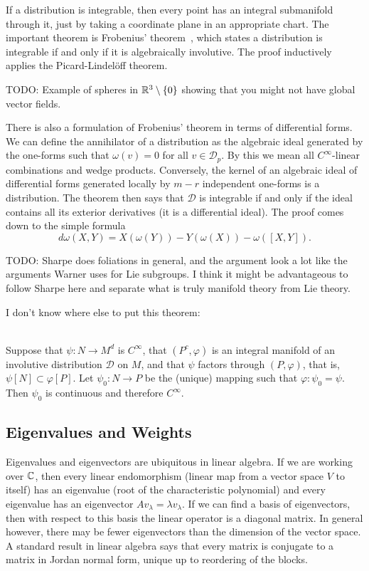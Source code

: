 If a distribution is integrable, then every point has an integral submanifold through it, just by taking a coordinate plane in an appropriate chart.
The important theorem is Frobenius' theorem~\cite[2.4.1]{Sharpe1997}, which states a distribution is integrable if and only if it is algebraically involutive.
The proof inductively applies the Picard-Lindelöff theorem.

TODO: Example of spheres in $\mathbb{R}^3\setminus\{0\}$ showing that you might not have global vector fields.

There is also a formulation of Frobenius' theorem in terms of differential forms.
We can define the annihilator of a distribution as the algebraic ideal generated by the one-forms such that $\omega(v) = 0$ for all $v \in \mathcal{D}_p$.
By this we mean all $C^\infty$-linear combinations and wedge products.
Conversely, the kernel of an algebraic ideal of differential forms generated locally by $m-r$ independent one-forms is a distribution.
The theorem then says that $\mathcal{D}$ is integrable if and only if the ideal contains all its exterior derivatives (it is a differential ideal).
The proof comes down to the simple formula
\[
d\omega(X,Y) = X(\omega(Y)) - Y(\omega(X)) - \omega([X,Y]).
\]

TODO: Sharpe does foliations in general, and the argument look a lot like the arguments Warner uses for Lie subgroups.
I think it might be advantageous to follow Sharpe here and separate what is truly manifold theory from Lie theory.


I don't know where else to put this theorem:
\begin{theorem}\label{theorem:cinfty}
\textup{\cite[1.62]{Warner1983}}\\
Suppose that $\psi \colon N \to M^d$ is $C^{\infty}$, that $(P^c,\varphi)$ is an integral manifold of an involutive distribution $\mathcal{D}$ on $M$, and that $\psi$ factors through $(P,\varphi)$, that is, $\psi[N] \subset \varphi[P]$. Let $\psi_0 \colon N \to P$ be the (unique) mapping such that $\varphi\colon \psi_0 = \psi$. Then $\psi_0$ is continuous and therefore $C^{\infty}$.
\end{theorem}

\subsection{Eigenvalues and Weights}

Eigenvalues and eigenvectors are ubiquitous in linear algebra.
If we are working over $\mathbb{C}$, then every linear endomorphism (linear map from a vector space $V$ to itself) has an eigenvalue (root of the characteristic polynomial) and every eigenvalue has an eigenvector $Av_\lambda = \lambda v_\lambda$.
If we can find a basis of eigenvectors, then with respect to this basis the linear operator is a diagonal matrix.
In general however, there may be fewer eigenvectors than the dimension of the vector space.
A standard result in linear algebra says that every matrix is conjugate to a matrix in Jordan normal form, unique up to reordering of the blocks.

